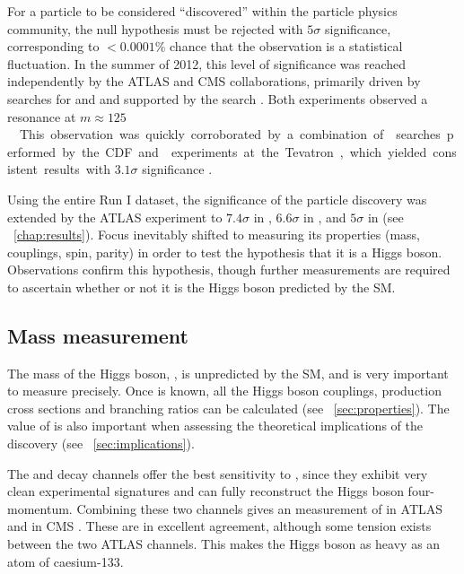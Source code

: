 
For a particle to be considered ``discovered'' within the particle physics community, 
the null hypothesis must be rejected with $5\sigma$ significance, 
corresponding to $<0.0001\%$ chance that the observation is a statistical fluctuation.
In the summer of 2012, this level of significance was reached independently by the ATLAS 
and CMS collaborations, primarily driven by searches for \HepProcess{\PHiggs \HepTo 
\Pphoton\Pphoton} and \HepProcess{\PHiggs \HepTo \PZ\PZ} and supported by the \HWW search 
\cite{ATLAS-discovery,CMS-discovery}. Both experiments observed a resonance at 
\unit{$m \approx 125$}{\GeV}.

This observation was quickly corroborated by a combination of \HepProcess{\PV\PHiggs 
\HepTo \PV\Pbottom\APbottom} searches performed by the CDF and \dzero experiments at the 
Tevatron, which yielded consistent results with $3.1\sigma$ significance 
\cite{Tevatron:2012}.

Using the entire Run I dataset, the significance of the particle discovery was extended 
by the ATLAS experiment to $7.4\sigma$ in \HepProcess{\PHiggs \HepTo \Pphoton\Pphoton} 
\cite{ATLAS:combination:2013}, $6.6\sigma$ in \HepProcess{\PHiggs \HepTo \PZ\PZ} 
\cite{ATLAS:combination:2013}, and $5\sigma$ in \HWW (see 
\Chapter~\ref{chap:results}). Focus inevitably shifted to measuring its properties (mass, 
couplings, spin, parity) in order to test the hypothesis that it is a Higgs boson.
Observations confirm this hypothesis, though further measurements are required to 
ascertain whether or not it is the Higgs boson predicted by the SM.



\subsection{Mass measurement}
\label{sec:searches:mass}

The mass of the Higgs boson, \mH, is unpredicted by the SM, and is very important to 
measure precisely. Once \mH is known, all the Higgs boson couplings, production cross 
sections and branching ratios can be calculated (see \Section~\ref{sec:properties}). The 
value of \mH is also important when assessing the theoretical implications of the 
discovery (see \Section~\ref{sec:implications}).

The \HepProcess{\PHiggs \HepTo \Pphoton\Pphoton} and \HepProcess{\PHiggs \HepTo \PZ\PZ} 
decay channels offer the best sensitivity to \mH, since they exhibit very clean 
experimental signatures and can fully reconstruct the Higgs boson four-momentum.
Combining these two channels gives an \mH measurement of 
\unit{}{\GeV} in ATLAS \cite{ATLAS:combination:2013} and 
\unit{}{\GeV} in CMS \cite{CMS:mass}. These are in excellent 
agreement, although some tension exists between the two ATLAS channels. This makes the 
Higgs boson as heavy as an atom of caesium-133.

